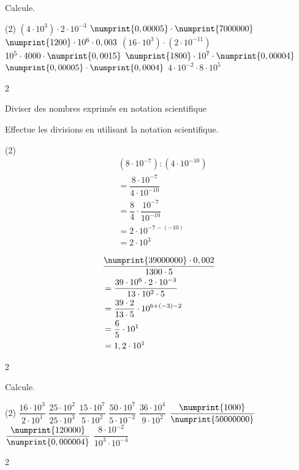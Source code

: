 \documentclass[a4paper,11pt]{report}
\begin{document}
\begin{exo}{
Calcule.
\begin{tasks}(2)
    \task $(4\cdot10^3)\cdot2\cdot10^{-3}$
    \task $\numprint{0,00005}\cdot\numprint{7000000}$
    \task $\numprint{1200}\cdot10^6\cdot0,003$
    \task $(16\cdot10^3)\cdot(2\cdot10^{-11})$
    \task $10^5\cdot4000\cdot\numprint{0,0015}$
    \task $\numprint{1800}\cdot10^7\cdot\numprint{0,00004}$
    \task $\numprint{0,00005}\cdot\numprint{0,0004}$
    \task $4\cdot10^{-2}\cdot8\cdot10^5$
\end{tasks}
}{2}    
\end{exo}

\begin{resolu}{Diviser des nombres exprimés en notation scientifique}{
Effectue les divisions en utilisant la notation scientifique.
\begin{tasks}(2)
    \task   \addtolength{\jot}{5mm}    
            \begin{align*}
            &(8\cdot10^{-7}):(4\cdot10^{-10})\\
            &=\dfrac{8\cdot10^{-7}}{4\cdot10^{-10}}\\
            &=\dfrac{8}{4}\cdot\dfrac{10^{-7}}{10^{-10}}\\
            &=2\cdot10^{-7-(-10)}\\
            &=2\cdot10^3
            \end{align*}
    
    
    \task   \addtolength{\jot}{5mm} 
            \begin{align*}
            &\dfrac{\numprint{39000000}\cdot0,002}{1300\cdot5}\\
            &=\dfrac{39\cdot10^6\cdot2\cdot10^{-3}}{13\cdot10^2\cdot5}\\
            &=\dfrac{39\cdot2}{13\cdot5}\cdot10^{6+(-3)-2}\\
            &=\dfrac{6}{5}\cdot10^{1}\\
            &=1,2\cdot10^{1}
            \end{align*}
\end{tasks}
}{2}    
\end{resolu}

\begin{exo}{
Calcule.
\begin{tasks}(2)
    \task $\dfrac{16\cdot10^3}{2\cdot10^1}$
    \task $\dfrac{25\cdot10^2}{25\cdot10^3}$
    \task $\dfrac{15\cdot10^7}{5\cdot10^2}$
    \task $\dfrac{50\cdot10^7}{5\cdot10^{-2}}$
    \task $\dfrac{36\cdot10^4}{9\cdot10^2}$
    \task $\dfrac{\numprint{1000}}{\numprint{50000000}}$
    \task $\dfrac{\numprint{120000}}{\numprint{0,000004}}$
    \task $\dfrac{8\cdot10^{-2}}{10^3\cdot10^{-4}}$
\end{tasks}
}{2}    
\end{exo}
\end{document}
